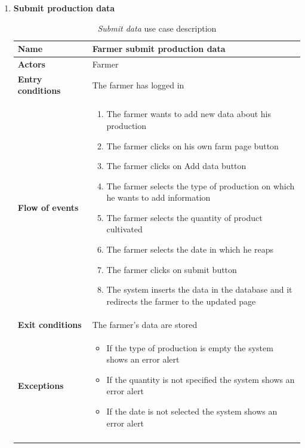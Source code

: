 \begin{enumerate}
    \item \textbf{Submit production data}
        \begin{longtable}{p{0.26\linewidth}p{0.75\linewidth}}
            \toprule
            \textbf{Name} & \textbf{Farmer submit production data} \\
            \midrule
            \textbf{Actors} & Farmer \\
            \midrule
            \textbf{Entry conditions} & The farmer has logged in\\
            \midrule
            \textbf{Flow of events} & 
            \begin{enumerate}
                \item The farmer wants to add new data about his production
                \item The farmer clicks on his own farm page button
                \item The farmer clicks on Add data button
                \item The farmer selects the type of production on which he wants to add information
                \item The farmer selects the quantity of product cultivated
                \item The farmer selects the date in which he reaps 
                \item The farmer clicks on submit button
                \item The system inserts the data in the database and it redirects the farmer to the updated page
            \end{enumerate} \\
            \midrule
            \textbf{Exit conditions} & The farmer's data are stored\\
            \midrule
            \textbf{Exceptions} & 
            \begin{itemize}
                \item If the type of production is empty the system shows an error alert
                \item If the quantity is not specified the system shows an error alert
                \item If the date is not selected the system shows an error alert
            \end{itemize} \\
            \bottomrule
            \caption{\emph{Submit data} use case description}
        \end{longtable}


\end{enumerate}
